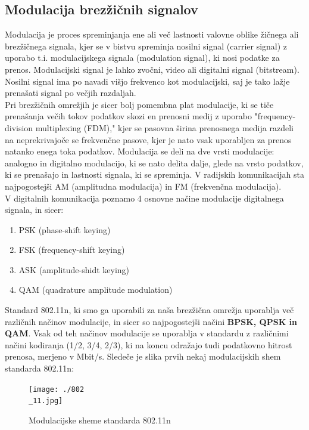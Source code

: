 \documentclass[11pt,a4paper,slovene]{article}
\begin{document}
\subsection{Modulacija brezžičnih signalov}
Modulacija je proces spreminjanja ene ali več lastnosti valovne oblike žičnega ali brezžičnega signala, kjer se v bistvu spreminja nosilni signal (carrier signal) z uporabo t.i. modulacijskega signala (modulation signal), ki nosi podatke za prenos. Modulacijski signal je lahko zvočni, video ali digitalni signal (bitstream). Nosilni signal ima po navadi višjo frekvenco kot modulacijski, saj je tako lažje prenašati signal po večjih razdaljah.\\
Pri brezžičnih omrežjih je sicer bolj pomembna plat modulacije, ki se tiče prenašanja večih tokov podatkov skozi en prenosni medij z uporabo "frequency-division multiplexing (FDM)," kjer se pasovna širina prenosnega medija razdeli na neprekrivajoče se frekvenčne pasove, kjer je nato vsak uporabljen za prenos natanko enega toka podatkov. Modulacija se deli na dve vrsti modulacije: analogno in digitalno modulacijo, ki se nato delita dalje, glede na vrsto podatkov, ki se prenašajo in lastnosti signala, ki se spreminja. V radijskih komunikacijah sta najpogostejši AM (amplitudna modulacija) in FM (frekvenčna modulacija).\\
V digitalnih komunikacija poznamo 4 osnovne načine modulacije digitalnega signala, in sicer:
\begin{enumerate}
\item PSK (phase-shift keying)
\item FSK (frequency-shift keying)
\item ASK (amplitude-shidt keying)
\item QAM (quadrature amplitude modulation)\cite{enwiki:1152116503}
\end{enumerate}

Standard 802.11n, ki smo ga uporabili za naša brezžična omrežja uporablja več različnih načinov modulacije, in sicer so najpogostejši načini \textbf{BPSK, QPSK in QAM}. Vsak od teh načinov modulacije se uporablja v standardu z različnimi načini kodiranja (1/2, 3/4, 2/3), ki na koncu odražajo tudi podatkovno hitrost prenosa, merjeno v Mbit/s. Sledeče je slika prvih nekaj modulacijskih shem standarda 802.11n:
\begin{figure}[H]
	\texttt{[image: ./802\\\_11.jpg]}
	\centering
	\caption{Modulacijske sheme standarda 802.11n}
\end{figure}
\end{document}
